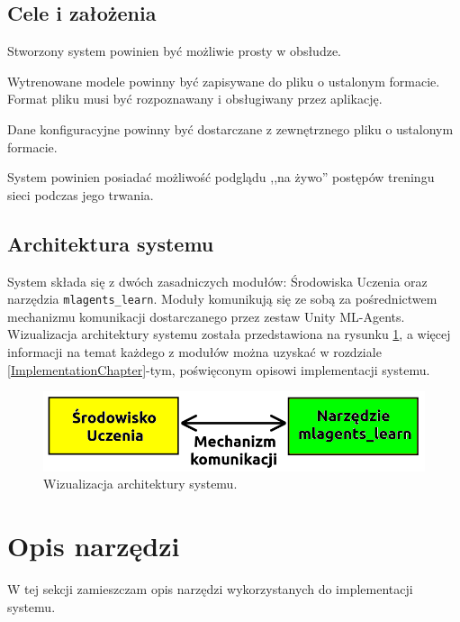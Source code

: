 \subsection{Cele i założenia}
\begin{enumerate*}
\item Stworzony system powinien być możliwie prosty w obsłudze.
\item Wytrenowane modele powinny być zapisywane do pliku o ustalonym formacie. Format pliku musi być rozpoznawany i obsługiwany przez aplikację.
\item Dane konfiguracyjne powinny być dostarczane z zewnętrznego pliku o ustalonym formacie.
\item System powinien posiadać możliwość podglądu ,,na żywo'' postępów treningu sieci podczas jego trwania.
\end{enumerate*}

\subsection{Architektura systemu}
\label{SoftwareArchSection}
System składa się z dwóch zasadniczych modułów: Środowiska Uczenia oraz narzędzia \texttt{mlagents\_learn}. Moduły komunikują się ze sobą za pośrednictwem mechanizmu komunikacji dostarczanego przez zestaw Unity ML-Agents. Wizualizacja architektury systemu została przedstawiona na rysunku \ref{SystemArchitecture}, a więcej informacji na temat każdego z modułów można uzyskać w rozdziale \ref{ImplementationChapter}-tym, poświęconym opisowi implementacji systemu. \\

\begin{figure}[h]
\begin{center}
\includegraphics[width=15cm]{resources/figures/system_architecture.png}
\caption{Wizualizacja architektury systemu.}
\label{SystemArchitecture}
\end{center}
\end{figure}

\section{Opis narzędzi}
W tej sekcji zamieszczam opis narzędzi wykorzystanych do implementacji systemu.
